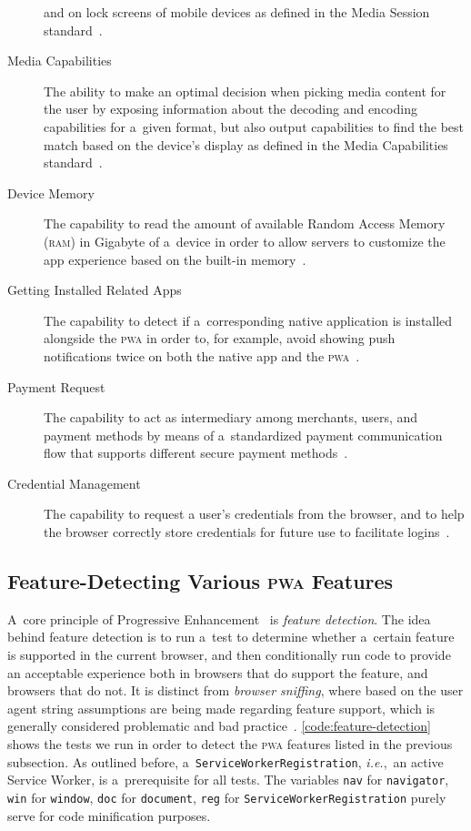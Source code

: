 \documentclass[sigconf]{acmart}
\begin{document}
\begin{description}
    and on lock screens of mobile devices
    as defined in the Media Session standard~\cite{lamouri2017mediasessionapi}.
  \item[Media Capabilities] The ability to make an optimal decision
    when picking media content for the user by exposing information
    about the decoding and encoding capabilities for a~given format,
    but also output capabilities to find the best match based on the device's display
    as defined in the Media Capabilities standard~\cite{lamouri2017mediacapabilities}.
  \item[Device Memory] The capability to read the amount of available
    Random Access Memory (\textsc{ram}) in Gigabyte
    of a~device in order to allow servers to customize the app experience
    based on the built-in memory~\cite{panicker2017devicememory}.
  \item[Getting Installed Related Apps] The capability to detect if a~corresponding
    native application is installed alongside the \textsc{pwa} in order to,
    for example, avoid showing push notifications twice
    on both the native app and the \textsc{pwa}~\cite{kinlan2017relatedapps}.
  \item[Payment Request] The capability to act as intermediary among merchants,
    users, and payment methods by means of a~standardized payment communication flow
    that supports different secure payment methods~\cite{bateman2017paymentrequest}.
  \item[Credential Management] The capability to request a user's credentials
    from the browser, and to help the browser correctly store credentials
    for future use to facilitate logins~\cite{west2017credentialmanagement}.
\end{description} 

\subsection{Feature-Detecting Various \textsc{pwa} Features}

A~core principle of Progressive Enhancement~\cite{champeon2003progressiveenhancement}
is \emph{feature detection}.
The idea behind feature detection is to run a~test to determine
whether a~certain feature is supported in the current browser,
and then conditionally run code to provide an acceptable experience
both in browsers that do support the feature, and browsers that do not.
It is distinct from \emph{browser sniffing}, where based on the user agent string
assumptions are being made regarding feature support,
which is generally considered problematic and bad practice~\cite{andersen2008useragent}.
\autoref{code:feature-detection} shows the tests
we run in order to detect the \textsc{pwa} features listed in the previous subsection.
As outlined before, a~\texttt{ServiceWorkerRegistration},
\emph{i.e.},\ an active Service Worker, is a~prerequisite for all tests.  
The variables \texttt{nav} for \texttt{navigator},
\texttt{win} for \texttt{window}, \texttt{doc} for \texttt{document},
\texttt{reg} for \texttt{ServiceWorkerRegistration}
purely serve for code minification purposes.
\end{document}
